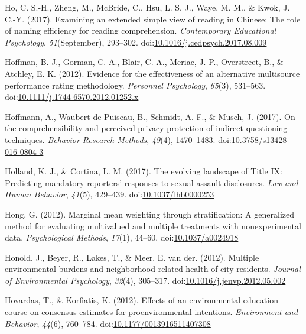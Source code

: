 \documentclass[english,man]{apa6}
\begin{document}
\hypertarget{ref-Ho2017}{}
Ho, C. S.-H., Zheng, M., McBride, C., Hsu, L. S. J., Waye, M. M., \&
Kwok, J. C.-Y. (2017). Examining an extended simple view of reading in
Chinese: The role of naming efficiency for reading comprehension.
\emph{Contemporary Educational Psychology}, \emph{51}(September),
293--302.
doi:\href{https://doi.org/10.1016/j.cedpsych.2017.08.009}{10.1016/j.cedpsych.2017.08.009}

\hypertarget{ref-Hoffman2012}{}
Hoffman, B. J., Gorman, C. A., Blair, C. A., Meriac, J. P., Overstreet,
B., \& Atchley, E. K. (2012). Evidence for the effectiveness of an
alternative multisource performance rating methodology. \emph{Personnel
Psychology}, \emph{65}(3), 531--563.
doi:\href{https://doi.org/10.1111/j.1744-6570.2012.01252.x}{10.1111/j.1744-6570.2012.01252.x}

\hypertarget{ref-Hoffmann2016}{}
Hoffmann, A., Waubert de Puiseau, B., Schmidt, A. F., \& Musch, J.
(2017). On the comprehensibility and perceived privacy protection of
indirect questioning techniques. \emph{Behavior Research Methods},
\emph{49}(4), 1470--1483.
doi:\href{https://doi.org/10.3758/s13428-016-0804-3}{10.3758/s13428-016-0804-3}

\hypertarget{ref-Holland2017}{}
Holland, K. J., \& Cortina, L. M. (2017). The evolving landscape of
Title IX: Predicting mandatory reporters' responses to sexual assault
disclosures. \emph{Law and Human Behavior}, \emph{41}(5), 429--439.
doi:\href{https://doi.org/10.1037/lhb0000253}{10.1037/lhb0000253}

\hypertarget{ref-Hong2012}{}
Hong, G. (2012). Marginal mean weighting through stratification: A
generalized method for evaluating multivalued and multiple treatments
with nonexperimental data. \emph{Psychological Methods}, \emph{17}(1),
44--60. doi:\href{https://doi.org/10.1037/a0024918}{10.1037/a0024918}

\hypertarget{ref-Honold2012}{}
Honold, J., Beyer, R., Lakes, T., \& Meer, E. van der. (2012). Multiple
environmental burdens and neighborhood-related health of city residents.
\emph{Journal of Environmental Psychology}, \emph{32}(4), 305--317.
doi:\href{https://doi.org/10.1016/j.jenvp.2012.05.002}{10.1016/j.jenvp.2012.05.002}

\hypertarget{ref-Hovardas2012}{}
Hovardas, T., \& Korfiatis, K. (2012). Effects of an environmental
education course on consensus estimates for proenvironmental intentions.
\emph{Environment and Behavior}, \emph{44}(6), 760--784.
doi:\href{https://doi.org/10.1177/0013916511407308}{10.1177/0013916511407308}
\end{document}
